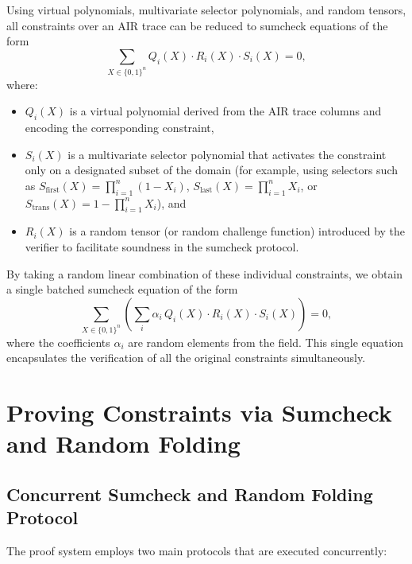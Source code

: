 \documentclass{article}
\begin{document}
Using virtual polynomials, multivariate selector polynomials, and random tensors, all constraints over an AIR trace can be reduced to sumcheck equations of the form
\[
\sum_{X \in \{0, 1\}^n} Q_i(X) \cdot R_i(X) \cdot S_i(X) = 0,
\]
where:
\begin{itemize}
    \item \( Q_i(X) \) is a virtual polynomial derived from the AIR trace columns and encoding the corresponding constraint,
    \item \( S_i(X) \) is a multivariate selector polynomial that activates the constraint only on a designated subset of the domain (for example, using selectors such as \( S_{\text{first}}(X) = \prod_{i=1}^n (1-X_i) \), \( S_{\text{last}}(X) = \prod_{i=1}^n X_i \), or \( S_{\text{trans}}(X) = 1-\prod_{i=1}^n X_i \)), and
    \item \( R_i(X) \) is a random tensor (or random challenge function) introduced by the verifier to facilitate soundness in the sumcheck protocol.
\end{itemize}

By taking a random linear combination of these individual constraints, we obtain a single batched sumcheck equation of the form
\[
\sum_{X \in \{0, 1\}^n} \left( \sum_i \alpha_i \, Q_i(X) \cdot R_i(X) \cdot S_i(X) \right) = 0,
\]
where the coefficients \( \alpha_i \) are random elements from the field. This single equation encapsulates the verification of all the original constraints simultaneously.


\section{Proving Constraints via Sumcheck and Random Folding}




\subsection{Concurrent Sumcheck and Random Folding Protocol}

The proof system employs two main protocols that are executed concurrently:
\end{document}
